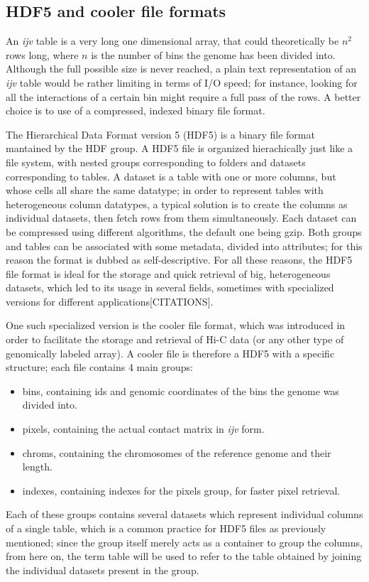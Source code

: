 \subsection{HDF5 and cooler file formats}
An \emph{ijv} table is a very long one dimensional array, that could theoretically be $n^2$ rows long, where $n$ is the number of bins the genome has been divided into. Although the full possible size is never reached, a plain text representation of an \emph{ijv} table would be rather limiting in terms of I/O speed; for instance, looking for all the interactions of a certain bin might require a full pass of the rows. A better choice is to use of a compressed, indexed binary file format. 

The Hierarchical Data Format version 5 (HDF5) is a binary file format mantained by the HDF group\cite{hdfgroup}. A HDF5 file is organized hierachically just like a file system, with nested groups corresponding to folders and datasets corresponding to tables. A dataset is a table with one or more columns, but whose cells all share the same datatype; in order to represent tables with heterogeneous column datatypes, a typical solution is to create the columns as individual datasets, then fetch rows from them simultaneously. Each dataset can be compressed using different algorithms, the default one being gzip. Both groups and tables can be associated with some metadata, divided into attributes; for this reason the format is dubbed as self-descriptive. For all these reasons, the HDF5 file format is ideal for the storage and quick retrieval of big, heterogeneous datasets, which led to its usage in several fields, sometimes with specialized versions for different applications[CITATIONS].

One such specialized version is the cooler file format, which was introduced in order to facilitate the storage and retrieval of Hi-C data (or any other type of genomically labeled array)\cite{cooler2020}. A cooler file is therefore a HDF5 with a specific structure; each file contains 4 main groups:
\begin{itemize}\tightlist
  \item bins, containing ids and genomic coordinates of the bins the genome was divided into.
  \item pixels, containing the actual contact matrix in \emph{ijv} form.
  \item chroms, containing the chromosomes of the reference genome and their length.
  \item indexes, containing indexes for the pixels group, for faster pixel retrieval.
\end{itemize}
Each of these groups contains several datasets which represent individual columns of a single table, which is a common practice for HDF5 files as previously mentioned; since the group itself merely acts as a container to group the columns, from here on, the term table will be used to refer to the table obtained by joining the individual datasets present in the group.

